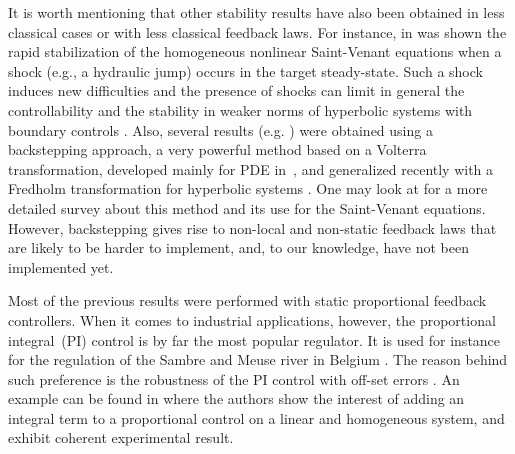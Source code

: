 \documentclass[11pt]{article}
\newcommand{\eg}{e.g.,\xspace}
\numberwithin{equation}{section}
\theoremstyle{definition}
\begin{document}
It is worth mentioning that other stability results have also been obtained in less classical cases or with less classical feedback laws.
For instance, in \cite{stvenantjump} was shown the rapid stabilization of the homogeneous nonlinear Saint-Venant equations when a shock (\eg a hydraulic jump) occurs in the target steady-state.
Such {a} shock indu\-ces new difficulties and the presence of shocks can limit in general the controllability and the stability in weaker norms of hyperbolic systems
with boundary controls
\hbox{\cite{ABG,BG}}.
Also, several results (e.g.
\cite{CVBK})
were obtained using a backstepping approach, a very powerful method based on a Volterra transformation, developed mainly for PDE in~\cite{KrsticBook},
and generalized recently with a Fredholm transformation for hyperbolic systems \hbox{\cite{CoronFredholm,Zhang,Zhang2}}.
One may look at \cite{HS} for a more detailed survey about this method and its use for the Saint-Venant equations.
However, backstepping gives rise to non-local and non-static feedback laws that are likely to be harder to implement, and, to our knowledge, have not been implemented yet.

Most of the previous results were performed with static proportional feedback controllers. When it comes to industrial applications, however, the proportional integral~(PI) control is by far the most popular regulator.
It is used for instance for the regulation of the Sambre and Meuse river in Belgium \cite[Chap.\,8]{BastinCoron1D}.
The reason behind such preference is the robustness of the PI control with off-set errors \cite[Chap.\,11.3]{Astrom2}. {An example can be found in \cite{DosSantosBastinCoron}
where the authors show the interest of adding an integral term to a proportional control on a linear and homogeneous system, and exhibit coherent experimental result.}\enlargethispage{.5\baselineskip}%
\end{document}
